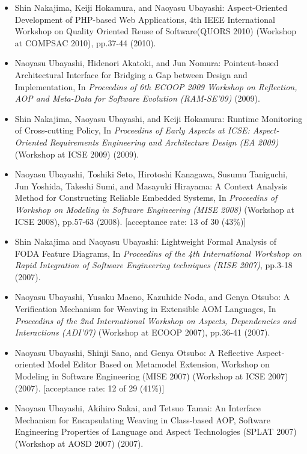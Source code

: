 \documentclass{article}
\begin{document}
\begin{itemize}
\item Shin Nakajima, Keiji Hokamura, and Naoyasu Ubayashi:
Aspect-Oriented Development of PHP-based Web Applications,
4th IEEE International Workshop on Quality Oriented Reuse of Software(QUORS 2010) (Workshop at COMPSAC 2010),
pp.37-44 (2010).

\item Naoyasu Ubayashi, Hidenori Akatoki, and Jun Nomura:
Pointcut-based Architectural Interface for Bridging a Gap between Design and Implementation,
In {\em Proceedins of 6th ECOOP 2009 Workshop on Reflection, AOP and Meta-Data for Software Evolution (RAM-SE'09)} (2009).

\item Shin Nakajima, Naoyasu Ubayashi, and Keiji Hokamura:
Runtime Monitoring of Cross-cutting Policy,
In {\em Proceedins of Early Aspects at ICSE: Aspect-Oriented Requirements Engineering and Architecture Design (EA 2009)} (Workshop at ICSE 2009) (2009).

\item Naoyasu Ubayashi, Toshiki Seto, Hirotoshi Kanagawa, Susumu Taniguchi, Jun Yoshida, Takeshi Sumi, and Masayuki Hirayama:
A Context Analysis Method for Constructing Reliable Embedded Systems,
In {\em Proceedins of Workshop on Modeling in Software Engineering (MISE 2008)} (Workshop at ICSE 2008),
pp.57-63 (2008).
[acceptance rate: 13 of 30 (43\%)]

\item Shin Nakajima and Naoyasu Ubayashi:
Lightweight Formal Analysis of FODA Feature Diagrams,
In {\em Proceedins of the 4th International Workshop on Rapid Integration of Software Engineering techniques (RISE 2007)},
pp.3-18 (2007).

\item Naoyasu Ubayashi, Yusaku Maeno, Kazuhide Noda, and Genya Otsubo:
A Verification Mechanism for Weaving in Extensible AOM Languages,
In {\em Proceedins of the 2nd International Workshop on Aspects, Dependencies and Interactions (ADI'07)} (Workshop at ECOOP 2007),
pp.36-41 (2007).

\item Naoyasu Ubayashi, Shinji Sano, and Genya Otsubo:
A Reflective Aspect-oriented Model Editor Based on Metamodel Extension,
Workshop on Modeling in Software Engineering (MISE 2007) (Workshop at ICSE 2007) (2007).
[acceptance rate: 12 of 29 (41\%)]

\item Naoyasu Ubayashi, Akihiro Sakai, and Tetsuo Tamai:
An Interface Mechanism for Encapsulating Weaving in Class-based AOP,
Software Engineering Properties of Language and Aspect Technologies (SPLAT 2007) (Workshop at AOSD 2007) (2007).


\end{itemize}
\end{document}
